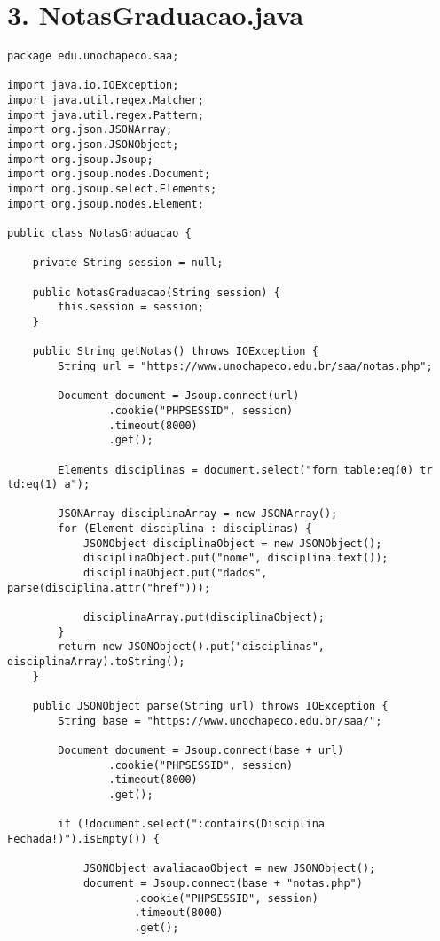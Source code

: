 \section*{3. NotasGraduacao.java}
\begin{lstlisting}
package edu.unochapeco.saa;

import java.io.IOException;
import java.util.regex.Matcher;
import java.util.regex.Pattern;
import org.json.JSONArray;
import org.json.JSONObject;
import org.jsoup.Jsoup;
import org.jsoup.nodes.Document;
import org.jsoup.select.Elements;
import org.jsoup.nodes.Element;

public class NotasGraduacao {

    private String session = null;

    public NotasGraduacao(String session) {
        this.session = session;
    }

    public String getNotas() throws IOException {
        String url = "https://www.unochapeco.edu.br/saa/notas.php";

        Document document = Jsoup.connect(url)
                .cookie("PHPSESSID", session)
                .timeout(8000)
                .get();

        Elements disciplinas = document.select("form table:eq(0) tr td:eq(1) a");

        JSONArray disciplinaArray = new JSONArray();
        for (Element disciplina : disciplinas) {
            JSONObject disciplinaObject = new JSONObject();
            disciplinaObject.put("nome", disciplina.text());
            disciplinaObject.put("dados", parse(disciplina.attr("href")));

            disciplinaArray.put(disciplinaObject);
        }
        return new JSONObject().put("disciplinas", disciplinaArray).toString();
    }

    public JSONObject parse(String url) throws IOException {
        String base = "https://www.unochapeco.edu.br/saa/";

        Document document = Jsoup.connect(base + url)
                .cookie("PHPSESSID", session)
                .timeout(8000)
                .get();

        if (!document.select(":contains(Disciplina Fechada!)").isEmpty()) {

            JSONObject avaliacaoObject = new JSONObject();
            document = Jsoup.connect(base + "notas.php")
                    .cookie("PHPSESSID", session)
                    .timeout(8000)
                    .get();


\end{lstlisting}
